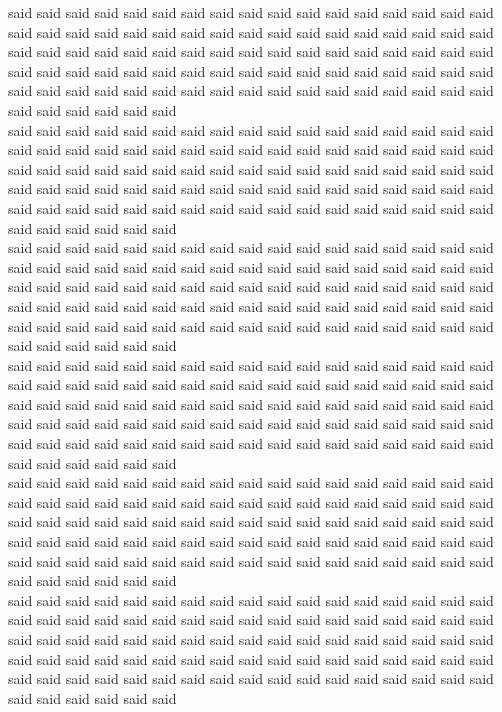 said said said said said said said said said said said said said said said said said said said said said said said said said said said said said said said said said said said said said said said said said said said said said said said said said said said said said said said said said said said said said said said said said said said said said said said said said said said said said said said said said said said said said said said said said said said\\
said said said said said said said said said said said said said said said said said said said said said said said said said said said said said said said said said said said said said said said said said said said said said said said said said said said said said said said said said said said said said said said said said said said said said said said said said said said said said said said said said said said said said said said said said said said\\
said said said said said said said said said said said said said said said said said said said said said said said said said said said said said said said said said said said said said said said said said said said said said said said said said said said said said said said said said said said said said said said said said said said said said said said said said said said said said said said said said said said said said said said said said said said\\
said said said said said said said said said said said said said said said said said said said said said said said said said said said said said said said said said said said said said said said said said said said said said said said said said said said said said said said said said said said said said said said said said said said said said said said said said said said said said said said said said said said said said said said said said said said\\
said said said said said said said said said said said said said said said said said said said said said said said said said said said said said said said said said said said said said said said said said said said said said said said said said said said said said said said said said said said said said said said said said said said said said said said said said said said said said said said said said said said said said said said said said said said\\
said said said said said said said said said said said said said said said said said said said said said said said said said said said said said said said said said said said said said said said said said said said said said said said said said said said said said said said said said said said said said said said said said said said said said said said said said said said said said said said said said said said said said said said said said said said\\
